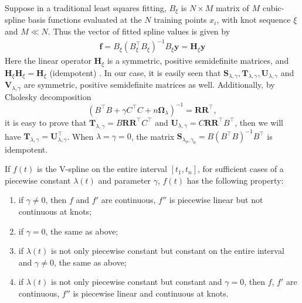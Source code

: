 Suppose in a traditional least squares fitting, $ B_\xi$ is $N \times M$ matrix of $M$ cubic-spline basis functions evaluated at the $N$ training points $x_i$, with knot sequence $\xi$ and $M \ll N$. Thus the vector of fitted spline values is given by
\begin{align}\label{fhy}
 \mathbf{\hat{f}}= B_\xi\left( B^\top_\xi B_\xi\right)^{-1} B_\xi\mathbf{y}=\mathbf{H}_\xi\mathbf{y}
\end{align}
Here the linear operator $\mathbf{H}_\xi$ is a symmetric, positive semidefinite matrices, and $\mathbf{H}_\xi\mathbf{H}_\xi=\mathbf{H}_\xi$ (idempotent) \citep{esl2009}. In our case, it is easily seen that $\mathbf{S}_{\lambda,\gamma}, \mathbf{T}_{\lambda,\gamma}, \mathbf{U}_{\lambda,\gamma}$ and $\mathbf{V}_{\lambda,\gamma}$ are symmetric, positive semidefinite matrices as well. Additionally, by Cholesky decomposition
\begin{equation}
\left( B^\top B+\gamma C^\top C+n\mathbf{\Omega}_{\lambda}\right)^{-1}=\mathbf{R}\mathbf{R}^\top,
\end{equation}
it is easy to prove that $\mathbf{T}_{\lambda,\gamma}= B\mathbf{R}\mathbf{R}^\top C^\top$ and $\mathbf{U}_{\lambda,\gamma}= C\mathbf{R}\mathbf{R}^\top B^\top$, then we will have 
 $\mathbf{T}_{\lambda,\gamma}= \mathbf{U}_{\lambda,\gamma}^\top$. When $\lambda=\gamma=0$, the matrix $\mathbf{S}_{\lambda_0,\gamma_0}= B\left( B^\top B\right)^{-1} B^\top$ is idempotent.  


\begin{corollary}\label{TractorsplineCorollary}
If $f(t)$ is the V-spline on the entire interval $[t_1,t_n]$, for sufficient cases of a piecewise constant $\lambda(t)$ and parameter $\gamma$, $f(t)$ has the following property:
\begin{enumerate}\itemsep0em 
\item if $\gamma \neq 0$, then $f$ and $f'$ are continuous, $f''$ is piecewise linear but not continuous at knots;
\item if $\gamma = 0$, the same as above;
\item if $\lambda(t)$ is not only piecewise constant but constant on the entire interval and $\gamma \neq 0$, the same as above;
\item if $\lambda(t)$ is not only piecewise constant but constant and $\gamma = 0$, then $f$, $f'$ are continuous, $f''$ is piecewise linear and continuous at knots.
\end{enumerate}
\end{corollary}

